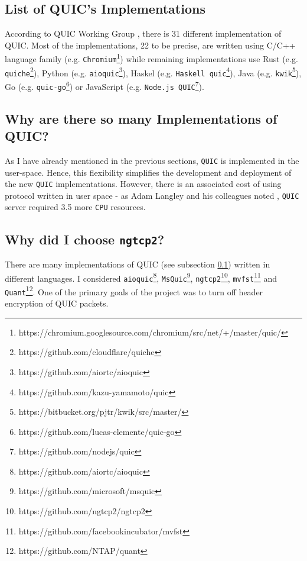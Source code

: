 \documentclass[12pt,a4paper,twoside,openright]{report}
\begin{document}
\subsection{List of QUIC's Implementations} \label{List_of_QUIC_implementations}
According to QUIC Working Group \cite{number_of_QUIC_implementations}, there is 31 different implementation of QUIC. Most of the implementations, 22 to be precise, are written using C/C++ language family (e.g. \texttt{Chromium}\footnote{https://chromium.googlesource.com/chromium/src/net/+/master/quic/}) while remaining implementations use Rust (e.g. \texttt{quiche}\footnote{https://github.com/cloudflare/quiche}), Python (e.g. \texttt{aioquic}\footnote{https://github.com/aiortc/aioquic}), Haskel (e.g. \texttt{Haskell quic}\footnote{https://github.com/kazu-yamamoto/quic}), Java (e.g. \texttt{kwik}\footnote{https://bitbucket.org/pjtr/kwik/src/master/}), Go (e.g. \texttt{quic-go}\footnote{https://github.com/lucas-clemente/quic-go}) or JavaScript (e.g. \texttt{Node.js QUIC}\footnote{https://github.com/nodejs/quic}).


\subsection{Why are there so many Implementations of QUIC?}

As I have already mentioned in the previous sections, \texttt{QUIC} is implemented in the user-space.
Hence, this flexibility simplifies the development and deployment of the new \texttt{QUIC} implementations.
However, there is an associated cost of using protocol written in user space - as Adam Langley and his colleagues noted \cite{QUIC_SERVER_REQUIRES_3-5_more_CPU_resources}, \texttt{QUIC} server required 3.5 more \texttt{CPU} resources.

\subsection{Why did I choose  \texttt{ngtcp2}?}
There are many implementations of QUIC (see subsection \ref{List_of_QUIC_implementations}) written in different languages.
I considered  \texttt{aioquic}\footnote{https://github.com/aiortc/aioquic},  \texttt{MsQuic}\footnote{https://github.com/microsoft/msquic},  \texttt{ngtcp2}\footnote{https://github.com/ngtcp2/ngtcp2},  \texttt{mvfst}\footnote{https://github.com/facebookincubator/mvfst} and \texttt{Quant}\footnote{https://github.com/NTAP/quant}.
One of the primary goals of the project was to turn off header encryption of QUIC packets.
\end{document}

